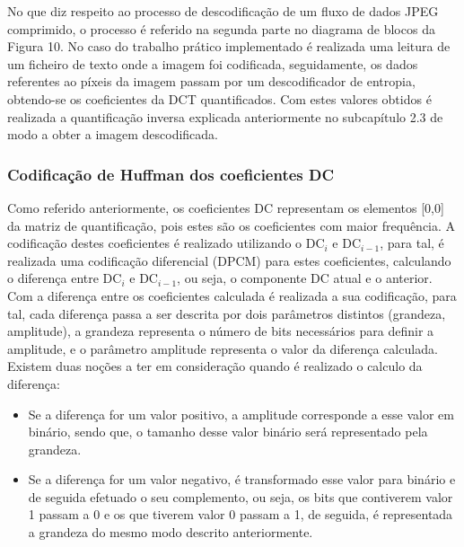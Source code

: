 \documentclass[12pt,a4paper]{article}
\begin{document}
No que diz respeito ao processo de descodificação de um fluxo de dados JPEG comprimido, o processo é referido na segunda parte no diagrama de blocos da Figura 10. No caso do trabalho prático implementado é realizada uma leitura de um ficheiro de texto onde a imagem foi codificada, seguidamente, os dados referentes ao píxeis da imagem passam por um descodificador de entropia, obtendo-se os coeficientes da DCT quantificados. Com estes valores obtidos é realizada a quantificação inversa explicada anteriormente no subcapítulo 2.3 de modo a obter a imagem descodificada. 

\subsubsection{Codificação de Huffman dos coeficientes DC}
Como referido anteriormente, os coeficientes DC representam os elementos [0,0] da matriz de quantificação, pois estes são os coeficientes com maior frequência. A codificação destes coeficientes é realizado utilizando o DC$_{i}$ e DC$_{i-1}$, para tal, é realizada uma codificação diferencial (DPCM) para estes coeficientes, calculando o diferença entre DC$_{i}$ e DC$_{i-1}$, ou seja, o componente DC atual e o anterior.\\
Com a diferença entre os coeficientes calculada é realizada a sua codificação, para tal, cada diferença passa a ser descrita por dois parâmetros distintos (grandeza, amplitude), a grandeza representa o número de bits necessários para definir a amplitude, e o parâmetro amplitude representa o valor da diferença calculada.\\
Existem duas noções a ter em consideração quando é realizado o calculo da diferença:

\begin{itemize}
 \item Se a diferença for um valor positivo, a amplitude corresponde a esse valor em binário, sendo que, o tamanho desse valor binário será representado pela grandeza.
 \item Se a diferença for um valor negativo, é transformado esse valor para binário e de seguida efetuado o seu complemento, ou seja, os bits que contiverem valor 1 passam a 0 e os que tiverem valor 0 passam a 1, de seguida, é representada a grandeza do mesmo modo descrito anteriormente.
 \end{itemize} 
 
\end{document}
